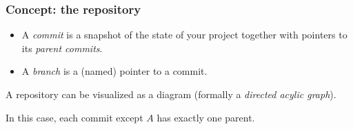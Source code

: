 \documentclass{beamer}
\begin{document}
\begin{frame}
    \frametitle{Concept: the repository}

    \begin{itemize}
        \item
            A \emph{commit} is a snapshot of the state of your project together
            with pointers to its \emph{parent commits}.

        \item
            A \emph{branch} is a (named) pointer to a commit.
    \end{itemize}

    A repository can be visualized as a diagram
    (formally a \emph{directed acylic graph}).

    \begin{center}
    \end{center}

    In this case, each commit except $A$ has exactly one parent.
\end{frame}
\end{document}
